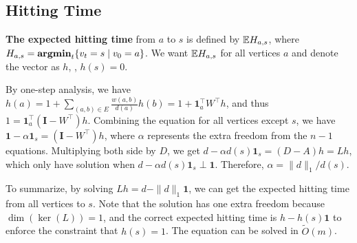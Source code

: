 \subsection{Hitting Time}

\textbf{The expected hitting time} from $a$ to $s$ is defined by $\mathbb{E} H_{a,s}$, where $H_{a,s} = \operatorname{\textbf{argmin}}_t\{v_t=s\mid v_0=a\}$. We want $\mathbb{E} H_{a,s}$ for all vertices $a$ and denote the vector as $h$, \eg, $h(s)=0$.

By one-step analysis, we have $h(a) = 1+\sum_{(a,b)\in E} \frac{w(a,b)}{d(a)} h(b) = 1+\boldsymbol{1}_a^\top W^\top h$, and thus $1 = \boldsymbol{1}_a^\top (\boldsymbol{I}-W^\top)h$. Combining the equation for all vertices except $s$, we have $\boldsymbol{1} - \alpha \boldsymbol{1}_s = (\boldsymbol{I}-W^\top)h$, where $\alpha$ represents the extra freedom from the $n-1$ equations. Multiplying both side by $D$, we get $d - \alpha d(s) \boldsymbol{1}_s = (D-A)h = Lh$, which only have solution when $d - \alpha d(s) \boldsymbol{1}_s \perp \boldsymbol{1}$. Therefore, $\alpha = \|d\|_1 / d(s)$. 

To summarize, by solving $Lh = d - \|d\|_1 \boldsymbol{1}$, we can get the expected hitting time from all vertices to $s$. Note that the solution has one extra freedom because $\dim(\ker(L))=1$, and the correct expected hitting time is $h - h(s)\boldsymbol{1}$ to enforce the constraint that $h(s)=1$. The equation can be solved in $\tilde{O}(m)$.
